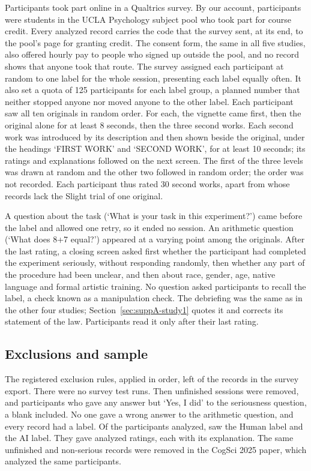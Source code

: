 Participants took part online in a Qualtrics survey. By our account, participants were students in the UCLA Psychology subject pool who took part for course credit. Every analyzed record carries the code that the survey sent, at its end, to the pool's page for granting credit. The consent form, the same in all five studies, also offered hourly pay to people who signed up outside the pool, and no record shows that anyone took that route. The survey assigned each participant at random to one label for the whole session, presenting each label equally often. It also set a quota of 125 participants for each label group, a planned number that neither stopped anyone nor moved anyone to the other label. Each participant saw all ten originals in random order. For each, the vignette came first, then the original alone for at least 8 seconds, then the three second works. Each second work was introduced by its description and then shown beside the original, under the headings `FIRST WORK' and `SECOND WORK', for at least 10 seconds; its ratings and explanations followed on the next screen. The first of the three levels was drawn at random and the other two followed in random order; the order was not recorded. Each participant thus rated 30 second works, apart from \STwoNLackingOneTrial{} whose records lack the Slight trial of one original.

A question about the task (`What is your task in this experiment?') came before the label and allowed one retry, so it ended no session. An arithmetic question (`What does 8+7 equal?') appeared at a varying point among the originals. After the last rating, a closing screen asked first whether the participant had completed the experiment seriously, without responding randomly, then whether any part of the procedure had been unclear, and then about race, gender, age, native language and formal artistic training. No question asked participants to recall the label, a check known as a manipulation check. The debriefing was the same as in the other four studies; Section~\ref{sec:suppA-study1} quotes it and corrects its statement of the law. Participants read it only after their last rating.

\subsection*{Exclusions and sample}

The registered exclusion rules, applied in order, left \STwoN{} of the \STwoNRecords{} records in the survey export. There were no survey test runs. Then \STwoNUnfinishedRemoved{} unfinished sessions were removed, and \STwoNNotSeriousRemoved{} participants who gave any answer but `Yes, I did' to the seriousness question, a blank included. No one gave a wrong answer to the arithmetic question, and every record had a label. Of the \STwoN{} participants analyzed, \STwoNHuman{} saw the Human label and \STwoNAI{} the AI label. They gave \STwoNRatings{} analyzed ratings, each with its explanation. The same unfinished and non-serious records were removed in the CogSci 2025 paper, which analyzed the same participants.


